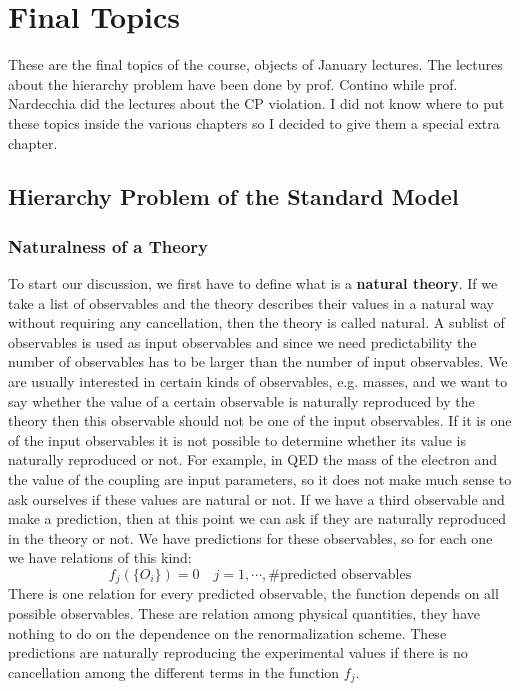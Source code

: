 \documentclass[../main.tex]{subfiles}
\begin{document}
\setchapterpreamble[u]{\margintoc}
\chapter[Final Topics]{Final Topics\footnotemark[0]}
These are the final topics of the course, objects of January lectures. The lectures about the hierarchy problem have been done by prof. Contino while prof. Nardecchia did the lectures about the CP violation. I did not know where to put these topics inside the various chapters so I decided to give them a special extra chapter.
\section{Hierarchy Problem of the Standard Model}
\subsection{Naturalness of a Theory}
To start our discussion, we first have to define what is a \textbf{natural theory}. If we take a list of observables and the theory describes their values in a natural way without requiring any cancellation, then the theory is called natural. A sublist of observables is used as input observables and since we need predictability the number of observables has to be larger than the number of input observables. We are usually interested in certain kinds of observables, e.g. masses, and we want to say whether the value of a certain observable is naturally reproduced by the theory then this observable should not be one of the input observables. If it is one of the input observables it is not possible to determine whether its value is naturally reproduced or not. For example, in QED the mass of the electron and the value of the coupling are input parameters, so it does not make much sense to ask ourselves if these values are natural or not. If we have a third observable and make a prediction, then at this point we can ask if they are naturally reproduced in the theory or not. We have predictions for these observables, so for each one we have relations of this kind:
\[
f_j(\{O_i\})=0 \quad j=1,\cdots,\text{\# predicted observables}
\]
There is one relation for every predicted observable, the function depends on all possible observables. These are relation among physical quantities, they have nothing to do on the dependence on the renormalization scheme. These predictions are naturally reproducing the experimental values if there is no cancellation among the different terms in the function $f_j$.\\
\end{document}
